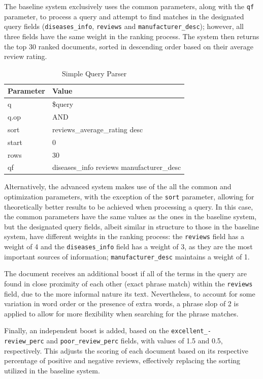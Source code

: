 \documentclass[sigconf]{acmart}
\begin{document}
The baseline system exclusively uses the common parameters, along with the \texttt{qf} parameter, to process a query and attempt to find matches in the designated query fields (\texttt{diseases\_info}, \texttt{reviews} and \texttt{manufacturer\_desc}); however, all three fields have the same weight in the ranking process. The system then returns the top 30 ranked documents, sorted in descending order based on their average review rating.

\begin{table}[H]
    \begin{tabular}{ll}
    \toprule
    Parameter & Value\\
    \midrule
    q & \$query\\
    q.op & AND\\
    sort & reviews\_average\_rating desc\\
    start & 0\\
    rows & 30\\
    qf & diseases\_info reviews manufacturer\_desc\\
    \bottomrule
    \end{tabular}
    \caption{Simple Query Parser}
    \label{tab:simple_query}
\end{table}

Alternatively, the advanced system makes use of the all the common and optimization parameters, with the exception of the \texttt{sort} parameter, allowing for theoretically better results to be achieved when processing a query. In this case, the common parameters have the same values as the ones in the baseline system, but the designated query fields, albeit similar in structure to those in the baseline system, have different weights in the ranking process: the \texttt{reviews} field has a weight of 4 and the \texttt{diseases\_info} field has a weight of 3, as they are the most important sources of information; \texttt{manufacturer\_desc} maintains a weight of 1. 

The document receives an additional boost if all of the terms in the query are found in close proximity of each other (exact phrase match) within the \texttt{reviews} field, due to the more informal nature its text. Nevertheless, to account for some variation in word order or the presence of extra words, a phrase slop of 2 is applied to allow for more flexibility when searching for the phrase matches.

Finally, an independent boost is added, based on the \texttt{excellent\_-\\review\_perc} and \texttt{poor\_review\_perc} fields, with values of 1.5 and 0.5, respectively. This adjusts the scoring of each document based on its respective percentage of positive and negative reviews, effectively replacing the sorting utilized in the baseline system.
\end{document}
